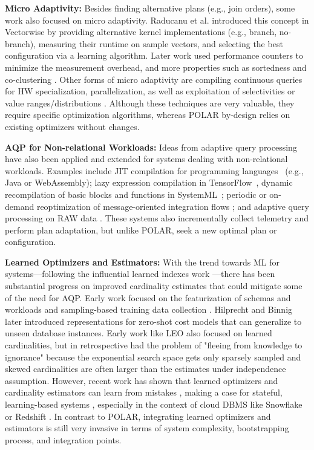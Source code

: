 \textbf{Micro Adaptivity:} Besides finding alternative plans (e.g., join orders), some work also focused on micro adaptivity. Raducanu et al. introduced this concept in Vectorwise \cite{RaducanuBZ13} by providing alternative kernel implementations (e.g., branch, no-branch), measuring their runtime on sample vectors, and selecting the best configuration via a learning algorithm. Later work used performance counters to minimize the measurement overhead, and more properties such as sortedness and co-clustering \cite{ZeuchPF16}. Other forms of micro adaptivity are compiling continuous queries for HW specialization, parallelization, as well as exploitation of selectivities or value ranges/distributions \cite{GrulichBZTBCRM20}. Although these techniques are very valuable, they require specific optimization algorithms, whereas POLAR by-design relies on existing optimizers without changes. 

\textbf{AQP for Non-relational Workloads:} Ideas from adaptive query processing have also been applied and extended for systems dealing with non-relational workloads. Examples include JIT compilation for programming languages~\cite{HolzleU94} (e.g., Java or WebAssembly); lazy expression compilation in TensorFlow~\cite{MoldovanDWJLNSR19}, dynamic recompilation of basic blocks and functions in SystemML~\cite{BoehmBERRSTT14}; periodic or on-demand reoptimization of message-oriented integration flows \cite{Boehm2011}; and adaptive query processing on RAW data \cite{KarpathiotakisBAA14}. These systems also incrementally collect telemetry and perform plan adaptation, but unlike POLAR, seek a new optimal plan or configuration. 

\textbf{Learned Optimizers and Estimators:} With the trend towards ML for systems---following the influential learned indexes work \cite{KraskaBCDP18}---there has been substantial progress on improved cardinality estimates that could mitigate some of the need for AQP. Early work focused on the featurization of schemas and workloads and sampling-based training data collection \cite{KipfKRLBK19,DuttWNKNC19,YangLKWDCAHKS19}. Hilprecht and Binnig later introduced representations for zero-shot cost models \cite{HilprechtB22,HilprechtB22b} that can generalize to unseen database instances. Early work like LEO \cite{StillgerLMK01} also focused on learned cardinalities, but in retrospective had the problem of "fleeing from knowledge to ignorance" \cite{Lohman17} because the exponential search space gets only sparsely sampled and skewed cardinalities are often larger than the estimates under independence assumption. However, recent work has shown that learned optimizers and cardinality estimators can learn from mistakes \cite{MarcusNMZAKPT19,MarcusNMTAK21}, making a case for stateful, learning-based systems \cite{abs-2303-15308}, especially in the context of cloud DBMS like Snowflake \cite{DagevilleCZAABC16} or Redshift \cite{GuptaATKPSS15}. In contrast to POLAR, integrating learned optimizers and estimators is still very invasive in terms of system complexity, bootstrapping process, and integration points.
